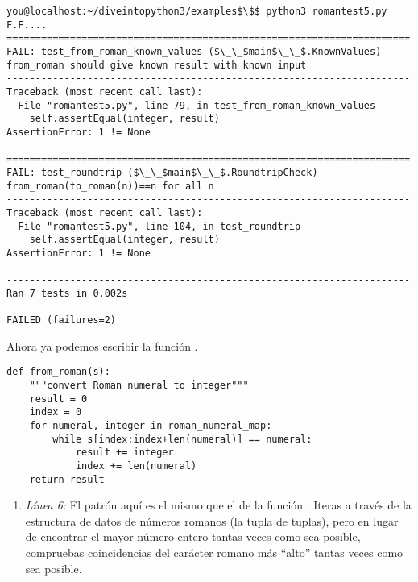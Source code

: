 \noindent\begin{minipage}{\textwidth}
\begin{lstlisting}[mathescape=True]
you@localhost:~/diveintopython3/examples$\$$ python3 romantest5.py
F.F....
======================================================================
FAIL: test_from_roman_known_values ($\_\_$main$\_\_$.KnownValues)
from_roman should give known result with known input
----------------------------------------------------------------------
Traceback (most recent call last):
  File "romantest5.py", line 79, in test_from_roman_known_values
    self.assertEqual(integer, result)
AssertionError: 1 != None

======================================================================
FAIL: test_roundtrip ($\_\_$main$\_\_$.RoundtripCheck)
from_roman(to_roman(n))==n for all n
----------------------------------------------------------------------
Traceback (most recent call last):
  File "romantest5.py", line 104, in test_roundtrip
    self.assertEqual(integer, result)
AssertionError: 1 != None

----------------------------------------------------------------------
Ran 7 tests in 0.002s

FAILED (failures=2)
\end{lstlisting}
\end{minipage}

Ahora ya podemos escribir la función .

\noindent\begin{minipage}{\textwidth}
\begin{lstlisting}[mathescape=True]
def from_roman(s):
    """convert Roman numeral to integer"""
    result = 0
    index = 0
    for numeral, integer in roman_numeral_map:
        while s[index:index+len(numeral)] == numeral:
            result += integer
            index += len(numeral)
    return result
\end{lstlisting}
\end{minipage}

\begin{enumerate}

\item \emph{Línea 6:} El patrón aquí es el mismo que el de la función . Iteras a través de la estructura de datos de números romanos (la tupla de tuplas), pero en lugar de encontrar el mayor número entero tantas veces como sea posible, compruebas coincidencias del carácter romano más ``alto'' tantas veces como sea posible.

\end{enumerate}

